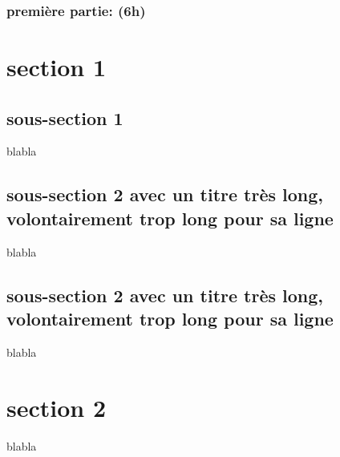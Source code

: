 \documentclass{beamer}
\begin{document}
\begin{frame}%
\frametitle{première partie: (6h)}
\tableofcontents
\end{frame}

\section{section 1}
\subsection{sous-section 1}
\begin{frame} blabla \end{frame}
\subsection{sous-section 2 avec un titre très long, volontairement
    trop long pour sa ligne}
\begin{frame} blabla \end{frame}
\subsection{sous-section 2 avec un titre très long, volontairement
    trop long pour sa ligne}
\begin{frame} blabla \end{frame}
\section{section 2}
\begin{frame} blabla \end{frame}
\end{document}
